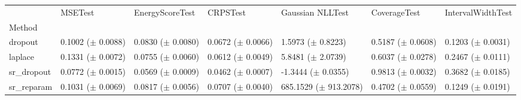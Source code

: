 \begin{tabular}{lllllll}
\toprule
 & MSETest & EnergyScoreTest & CRPSTest & Gaussian NLLTest & CoverageTest & IntervalWidthTest \\
Method &  &  &  &  &  &  \\
\midrule
dropout & \makecell{0.1002 \\ ($\pm$ 0.0088)} & \makecell{0.0830 \\ ($\pm$ 0.0080)} & \makecell{0.0672 \\ ($\pm$ 0.0066)} & \makecell{1.5973 \\ ($\pm$ 0.8223)} & \makecell{0.5187 \\ ($\pm$ 0.0608)} & \makecell{0.1203 \\ ($\pm$ 0.0031)} \\
laplace & \makecell{0.1331 \\ ($\pm$ 0.0072)} & \makecell{0.0755 \\ ($\pm$ 0.0060)} & \makecell{0.0612 \\ ($\pm$ 0.0049)} & \makecell{5.8481 \\ ($\pm$ 2.0739)} & \makecell{0.6037 \\ ($\pm$ 0.0278)} & \makecell{0.2467 \\ ($\pm$ 0.0111)} \\
sr_dropout & \makecell{0.0772 \\ ($\pm$ 0.0015)} & \makecell{0.0569 \\ ($\pm$ 0.0009)} & \makecell{0.0462 \\ ($\pm$ 0.0007)} & \makecell{-1.3444 \\ ($\pm$ 0.0355)} & \makecell{0.9813 \\ ($\pm$ 0.0032)} & \makecell{0.3682 \\ ($\pm$ 0.0185)} \\
sr_reparam & \makecell{0.1031 \\ ($\pm$ 0.0069)} & \makecell{0.0817 \\ ($\pm$ 0.0056)} & \makecell{0.0707 \\ ($\pm$ 0.0040)} & \makecell{685.1529 \\ ($\pm$ 913.2078)} & \makecell{0.4702 \\ ($\pm$ 0.0559)} & \makecell{0.1249 \\ ($\pm$ 0.0191)} \\
\bottomrule
\end{tabular}
